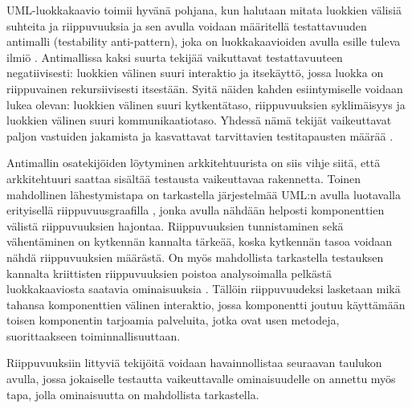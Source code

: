 \documentclass[finnish]{tktltiki2}
\numberwithin{table}{section}
\theoremstyle{definition}
\theoremstyle{remark}
\begin{document}
UML-luokkakaavio toimii hyvänä pohjana, kun halutaan mitata luokkien välisiä suhteita ja riippuvuuksia \citep{baudry_testability_2002} ja sen avulla voidaan määritellä testattavuuden antimalli (testability anti-pattern), joka on luokkakaavioiden avulla esille tuleva ilmiö \citep{baudry_measuring_2003}. Antimallissa kaksi suurta tekijää vaikuttavat testattavuuteen negatiivisesti: luokkien välinen suuri interaktio ja itsekäyttö, jossa luokka on riippuvainen rekursiivisesti itsestään. Syitä näiden kahden esiintymiselle voidaan lukea olevan: luokkien välinen suuri kytkentätaso, riippuvuuksien syklimäisyys ja luokkien välinen suuri kommunikaatiotaso. Yhdessä nämä tekijät vaikeuttavat paljon vastuiden jakamista ja kasvattavat tarvittavien testitapausten määrää \citep{baudry_measuring_2003}. 

Antimallin osatekijöiden löytyminen arkkitehtuurista on siis vihje siitä, että arkkitehtuuri saattaa sisältää testausta vaikeuttavaa rakennetta. Toinen mahdollinen lähestymistapa on tarkastella järjestelmää UML:n avulla luotavalla erityisellä riippuvuusgraafilla \citep{baudry_testability_2002}, jonka avulla nähdään helposti komponenttien välistä riippuvuuksien hajontaa. Riippuvuuksien tunnistaminen sekä vähentäminen on kytkennän kannalta tärkeää, koska kytkennän tasoa voidaan nähdä riippuvuuksien määrästä.  On myös mahdollista tarkastella testauksen kannalta kriittisten riippuvuuksien poistoa analysoimalla pelkästä luokkakaaviosta saatavia ominaisuuksia \citep{Jungmayr:2002}. Tällöin riippuvuudeksi lasketaan mikä tahansa komponenttien välinen interaktio, jossa komponentti joutuu käyttämään toisen komponentin tarjoamia palveluita, jotka ovat usen metodeja, suorittaakseen toiminnallisuuttaan. 

Riippuvuuksiin littyviä tekijöitä voidaan havainnollistaa seuraavan taulukon avulla, jossa jokaiselle testautta vaikeuttavalle ominaisuudelle on annettu myös tapa, jolla ominaisuutta on mahdollista tarkastella.
\end{document}
